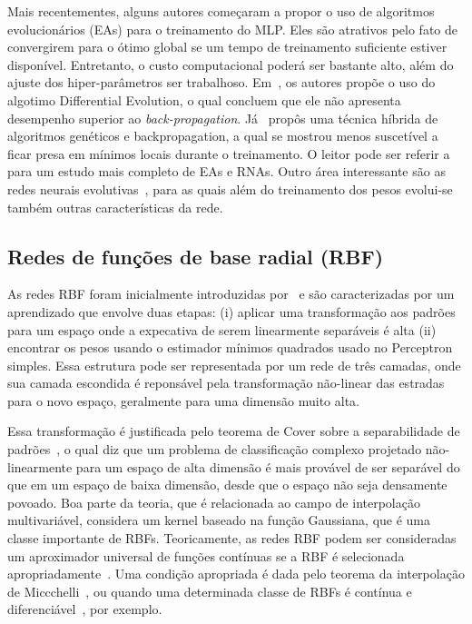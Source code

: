 \documentclass[conference]{IEEEtran}
\begin{document}
	
	Mais recentementes, alguns autores começaram a propor o uso de algoritmos evolucionários (EAs) para o treinamento do MLP. Eles são atrativos pelo fato de convergirem para o ótimo global se um tempo de treinamento suficiente estiver disponível. Entretanto, o custo computacional poderá ser bastante alto, além do ajuste dos hiper-parâmetros ser trabalhoso. Em~\cite{ilonen2003differential}, os autores propõe o uso do algotimo Differential Evolution, o qual concluem que ele não apresenta desempenho superior ao \textit{back-propagation}. Já~\cite{ding2011optimizing} propôs uma técnica híbrida de algoritmos genéticos e backpropagation, a qual se mostrou menos suscetível a ficar presa em mínimos locais durante o treinamento. O leitor pode ser referir a~\cite{mirjalili2019evolutionary} para um estudo mais completo de EAs e RNAs. Outro área interessante são as redes neurais evolutivas~\cite{yao1999evolving}, para as quais além do treinamento dos pesos evolui-se também outras características da rede.
	
	\subsection{Redes de funções de base radial (RBF)}
	As redes RBF foram inicialmente introduzidas por~\cite{broomhead1988multivariablefi} e são caracterizadas por um aprendizado que envolve duas etapas: (i) aplicar uma transformação aos padrões para um espaço onde a expecativa de serem linearmente separáveis é alta (ii) encontrar os pesos usando o estimador mínimos quadrados usado no Perceptron simples. Essa estrutura pode ser representada por um rede de três camadas, onde sua camada escondida é reponsável pela transformação não-linear das estradas para o novo espaço, geralmente para uma dimensão muito alta. 
	
	Essa transformação é justificada pelo teorema de Cover sobre a separabilidade de padrões~\cite{cover1965geometrical}, o qual diz que um problema de classificação complexo projetado não-linearmente para um espaço de alta dimensão é mais provável de ser separável do que em um espaço de baixa dimensão, desde que o espaço não seja densamente povoado. Boa parte da teoria, que é relacionada ao campo de interpolação multivariável, considera um kernel baseado na função Gaussiana, que é uma classe importante de RBFs. Teoricamente, as redes RBF podem ser consideradas um aproximador universal de funções contínuas se a RBF é selecionada apropriadamente~\cite{poggio1990networks, park1991universal, liao2003relaxed}. Uma condição apropriada é dada pelo teorema da interpolação de Miccchelli~\cite{micchelli1986interpolation}, ou quando uma determinada classe de RBFs é contínua e diferenciável~\cite{park1991universal}, por exemplo.
	 
\end{document}
